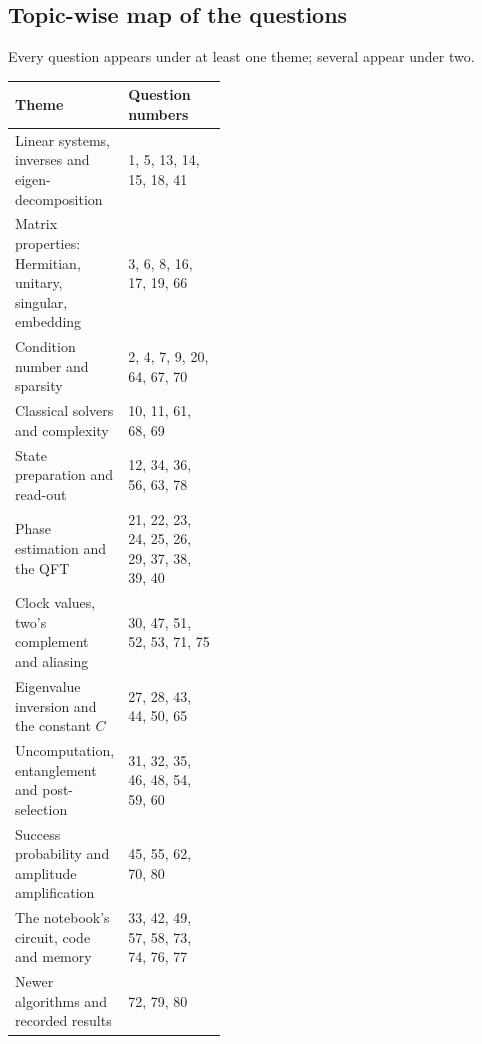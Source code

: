 \documentclass[11pt,a4paper]{article}
\begin{document}
\subsection*{Topic-wise map of the questions}\label{topicmap}
{\small Every question appears under at least one theme; several appear under two.\par}
{\small\renewcommand{\arraystretch}{1.2}
\begin{tabularx}{\linewidth}{@{}>{\raggedright\arraybackslash}p{0.42\linewidth}L@{}}
\toprule
\textbf{Theme} & \textbf{Question numbers}\\ \midrule
Linear systems, inverses and eigen-decomposition & 1, 5, 13, 14, 15, 18, 41 \\
Matrix properties: Hermitian, unitary, singular, embedding & 3, 6, 8, 16, 17, 19, 66 \\
Condition number and sparsity & 2, 4, 7, 9, 20, 64, 67, 70 \\
Classical solvers and complexity & 10, 11, 61, 68, 69 \\
State preparation and read-out & 12, 34, 36, 56, 63, 78 \\
Phase estimation and the QFT & 21, 22, 23, 24, 25, 26, 29, 37, 38, 39, 40 \\
Clock values, two's complement and aliasing & 30, 47, 51, 52, 53, 71, 75 \\
Eigenvalue inversion and the constant $C$ & 27, 28, 43, 44, 50, 65 \\
Uncomputation, entanglement and post-selection & 31, 32, 35, 46, 48, 54, 59, 60 \\
Success probability and amplitude amplification & 45, 55, 62, 70, 80 \\
The notebook's circuit, code and memory & 33, 42, 49, 57, 58, 73, 74, 76, 77 \\
Newer algorithms and recorded results & 72, 79, 80 \\
\bottomrule
\end{tabularx}}
\end{document}
